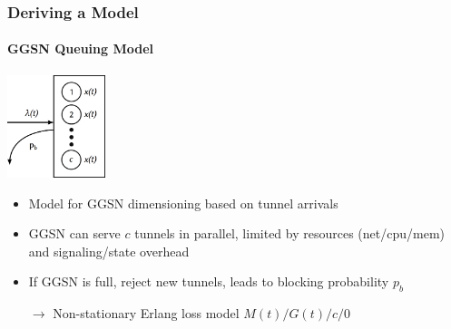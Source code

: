 \documentclass{beamer}
\begin{document}


\begin{frame}
	\frametitle{Deriving a Model}
	\framesubtitle{GGSN Queuing Model}
		\begin{center}
			\includegraphics[height=3cm]{extras/ggsn-monolithic.png}
		\end{center}

		\begin{itemize}
			\item Model for GGSN dimensioning based on tunnel arrivals
			\item GGSN can serve $c$ tunnels in parallel, limited by resources (net/cpu/mem) and signaling/state overhead
			\item If GGSN is full, reject new tunnels, leads to blocking probability $p_b$
			\item[$\rightarrow$] Non-stationary Erlang loss model $M(t)/G(t)/c/0$ 
		\end{itemize}

\end{frame}





\end{document}
